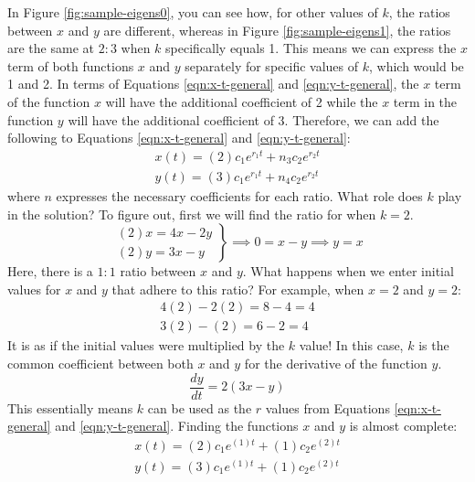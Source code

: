 \documentclass[12pt]{article}
\begin{document}
	In Figure \ref{fig:sample-eigens0}, you can see how, for other values of $k$, the ratios between $x$ and $y$ are different, whereas in Figure \ref{fig:sample-eigens1}, the ratios are the same at $2 : 3$ when $k$ specifically equals 1.
	This means we can express the $x$ term of both functions $x$ and $y$ separately for specific values of $k$, which would be 1 and 2.
	In terms of Equations \eqref{eqn:x-t-general} and \eqref{eqn:y-t-general}, the $x$ term of the function $x$ will have the additional coefficient of 2 while the $x$ term in the function $y$ will have the additional coefficient of 3.
	Therefore, we can add the following to Equations \eqref{eqn:x-t-general} and \eqref{eqn:y-t-general}:
	\begin{align}
		x(t) = (2)c_1e^{r_1t} + n_3c_2e^{r_2t} \label{eqn:x-t-partial} \\
		y(t) = (3)c_1e^{r_1t} + n_4c_2e^{r_2t} \label{eqn:y-t-partial}
	\end{align}
	where $n$ expresses the necessary coefficients for each ratio. What role does $k$ play in the solution? To figure out, first we will find the ratio for when $k = 2$.
	\begin{equation}
		\left. \begin{array}{l}
			(2)x = 4x - 2y \\
			(2)y = 3x - y
		\end{array} \right \}
		\implies 0 = x - y \implies y = x
	\end{equation}
	Here, there is a $1 : 1$ ratio between $x$ and $y$. What happens when we enter initial values for $x$ and $y$ that adhere to this ratio? For example, when $x = 2$ and $y = 2$:
	\begin{gather*}
		4(2) - 2(2) = 8 - 4 = 4 \\
		3(2) - (2) = 6 - 2 = 4 
	\end{gather*} %
	It is as if the initial values were multiplied by the $k$ value!
	In this case, $k$ is the common coefficient between both $x$ and $y$ for the derivative of the function $y$.
	\begin{equation}
		\frac{dy}{dt} = 2(3x - y)
	\end{equation}
	This essentially means $k$ can be used as the $r$ values from Equations \eqref{eqn:x-t-general} and \eqref{eqn:y-t-general}.
	Finding the functions $x$ and $y$ is almost complete:
	\begin{align}
		x(t) = (2)c_1e^{(1)t} + (1)c_2e^{(2)t} \\
		y(t) = (3)c_1e^{(1)t} + (1)c_2e^{(2)t}
	\end{align}
\end{document}
